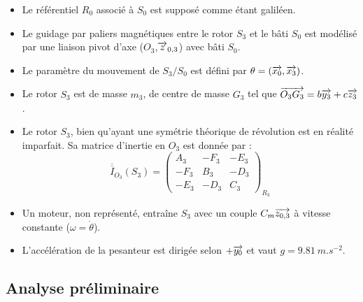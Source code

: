 \documentclass[10pt,fleqn]{article} %
\begin{document}
\begin{multicols}{2}
\begin{itemize}
\item Le référentiel $R_0$ associé à $S_0$ est supposé comme étant galiléen.
\item Le guidage par paliers magnétiques entre le rotor $S_3$ et le bâti $S_0$ est modélisé par une liaison pivot d'axe ($O_3$,$\overrightarrow{z}_{0,3}$) avec bâti $S_0$.
\item Le paramètre du mouvement de $S_3/S_0$ est défini par $\theta=(\overrightarrow{x_0},\overrightarrow{x_3})$.
\item Le rotor $S_3$ est de masse $m_3$, de centre de masse $G_3$ tel que $\overrightarrow{O_3G_3}=b \overrightarrow{y_3}+c\overrightarrow{z_3}$.
\item Le rotor $S_3$, bien qu'ayant une symétrie théorique de révolution est en réalité imparfait. Sa matrice d'inertie en $O_3$ est donnée par :
$$
\overline{\overline{I}}_{O_3}(S_3)=\left(\begin{array}{ccc}
A_3 & -F_3 & -E_3 \\ 
-F_3 & B_3 & -D_3 \\ 
-E_3 & -D_3 & C_3
\end{array} \right)_{R_3}
$$
\item Un moteur, non représenté, entraîne $S_3$ avec un couple $C_m \overrightarrow{z_{0,3}}$ à vitesse constante ($\omega=\dot{\theta}$).
\item L'accélération de la pesanteur est dirigée selon $+\overrightarrow{y_0}$ et vaut $g=\SI{9,81}{m.s^{-2}}$.
\end{itemize}
\end{multicols}

\subsection{Analyse préliminaire}
\end{document}

